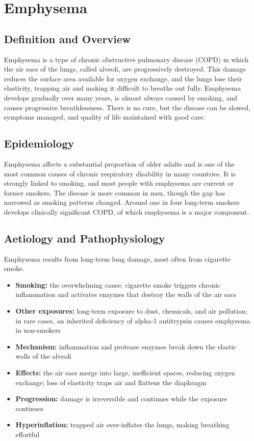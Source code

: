 \chapter{Emphysema}

\section*{Definition and Overview}
Emphysema is a type of chronic obstructive pulmonary disease (COPD) in which the air sacs of the lungs, called alveoli, are progressively destroyed. This damage reduces the surface area available for oxygen exchange, and the lungs lose their elasticity, trapping air and making it difficult to breathe out fully. Emphysema develops gradually over many years, is almost always caused by smoking, and causes progressive breathlessness. There is no cure, but the disease can be slowed, symptoms managed, and quality of life maintained with good care.

\section*{Epidemiology}
Emphysema affects a substantial proportion of older adults and is one of the most common causes of chronic respiratory disability in many countries. It is strongly linked to smoking, and most people with emphysema are current or former smokers. The disease is more common in men, though the gap has narrowed as smoking patterns changed. Around one in four long-term smokers develops clinically significant COPD, of which emphysema is a major component.

\section*{Aetiology and Pathophysiology}
Emphysema results from long-term lung damage, most often from cigarette smoke.
\begin{itemize}
    \item \textbf{Smoking:} the overwhelming cause; cigarette smoke triggers chronic inflammation and activates enzymes that destroy the walls of the air sacs
    \item \textbf{Other exposures:} long-term exposure to dust, chemicals, and air pollution; in rare cases, an inherited deficiency of alpha-1 antitrypsin causes emphysema in non-smokers
    \item \textbf{Mechanism:} inflammation and protease enzymes break down the elastic walls of the alveoli
    \item \textbf{Effects:} the air sacs merge into large, inefficient spaces, reducing oxygen exchange; loss of elasticity traps air and flattens the diaphragm
    \item \textbf{Progression:} damage is irreversible and continues while the exposure continues
    \item \textbf{Hyperinflation:} trapped air over-inflates the lungs, making breathing effortful
\end{itemize}

